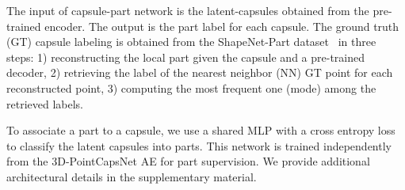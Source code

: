 \documentclass[10pt,twocolumn,letterpaper]{article}
\theoremstyle{break}
\begin{document}
The input of capsule-part network is the latent-capsules obtained from the pre-trained encoder. The output is the part label for each capsule. The ground truth (GT) capsule labeling is obtained from the ShapeNet-Part dataset~\cite{yi2016scalable} in three steps: 1) reconstructing the local part given the capsule and a pre-trained decoder, 2) retrieving the label of the nearest neighbor (NN) GT point for each reconstructed point, 3) computing the most frequent one (mode) among the retrieved labels.

To associate a part to a capsule, we use a shared MLP with a cross entropy loss to classify the latent capsules into parts. This network is trained independently from the 3D-PointCapsNet AE for part supervision. We provide additional architectural details in the supplementary material.



\begin{table*}[t!]
  \centering
  \caption{Descriptor matching results (recall) on the rotated 3DMatch benchmark~\cite{zeng20163dmatch,Deng_2018_ECCV}.}
  \vspace{-1mm}
\end{table*}
 
\end{document}
